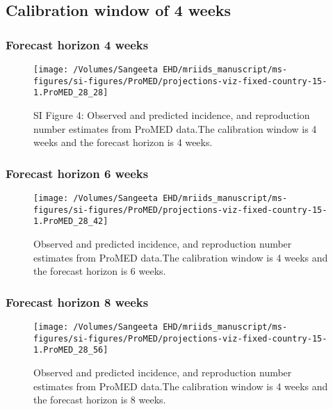 \documentclass[9pt,twoside,lineno]{pnas-new}
\begin{document}
\hypertarget{calibration-window-of-4-weeks}{%
  \subsection{Calibration window of 4 weeks}\label{calibration-window-of-4-weeks}}

\hypertarget{forecast-horizon-4-weeks}{%
  \subsubsection{Forecast horizon 4
    weeks}\label{forecast-horizon-4-weeks}}

\begin{figure}

  {
    \centering \texttt{[image: /Volumes/Sangeeta EHD/mriids\_manuscript/ms-figures/si-figures/ProMED/projections-viz-fixed-country-15-1.ProMED\_28\_28]} 
  }
  \caption{SI Figure  4: Observed and predicted incidence, and
    reproduction number estimates from ProMED data.The calibration
    window is 4 weeks and the forecast horizon is 4 weeks.}
  \label{fig:pm44}
\end{figure}

\hypertarget{forecast-horizon-6-weeks-1}{%
  \subsubsection{Forecast horizon 6
    weeks}\label{forecast-horizon-6-weeks-1}}

\begin{figure}

  {
    \centering \texttt{[image: /Volumes/Sangeeta EHD/mriids\_manuscript/ms-figures/si-figures/ProMED/projections-viz-fixed-country-15-1.ProMED\_28\_42]} 

  }
  \caption{Observed and predicted incidence, and reproduction number
    estimates from ProMED data.The calibration window is 4 weeks and
    the forecast horizon is 6 weeks.}
  \label{fig:pm46}
\end{figure}

\hypertarget{forecast-horizon-8-weeks-1}{%
  \subsubsection{Forecast horizon 8
    weeks}\label{forecast-horizon-8-weeks-1}}

\begin{figure}

  {
    \centering \texttt{[image: /Volumes/Sangeeta EHD/mriids\_manuscript/ms-figures/si-figures/ProMED/projections-viz-fixed-country-15-1.ProMED\_28\_56]} 

  }

  \caption{Observed and predicted incidence, and reproduction number
    estimates from ProMED data.The calibration window is 4 weeks and
    the forecast horizon is 8 weeks.}
  \label{fig:pm48}
\end{figure}
\end{document}
